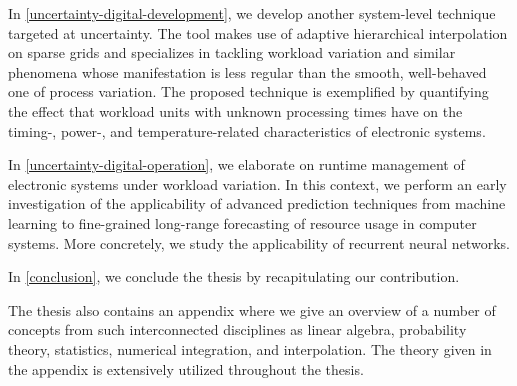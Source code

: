 In \cref{uncertainty-digital-development}, we develop another system-level
technique targeted at uncertainty. The tool makes use of adaptive hierarchical
interpolation on sparse grids and specializes in tackling workload variation and
similar phenomena whose manifestation is less regular than the smooth,
well-behaved one of process variation. The proposed technique is exemplified by
quantifying the effect that workload units with unknown processing times have on
the timing-, power-, and temperature-related characteristics of electronic
systems.

In \cref{uncertainty-digital-operation}, we elaborate on runtime management of
electronic systems under workload variation. In this context, we perform an
early investigation of the applicability of advanced prediction techniques from
machine learning to fine-grained long-range forecasting of resource usage in
computer systems. More concretely, we study the applicability of recurrent
neural networks.

In \cref{conclusion}, we conclude the thesis by recapitulating our contribution.

The thesis also contains an appendix where we give an overview of a number of
concepts from such interconnected disciplines as linear algebra, probability
theory, statistics, numerical integration, and interpolation. The theory given
in the appendix is extensively utilized throughout the thesis.
